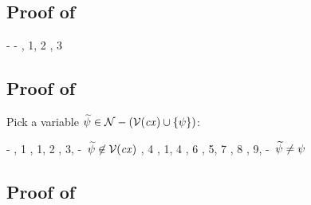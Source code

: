 \subsection*{Proof of }

\begin{derivation}
     {\hyp}
     {\hyp}
\step{\hastyO{\eqO}{\bool}}
     {\Reeq, 1, 2}
\step{\hastyO{\nega{(\eqO)}}{\bool}}
     {\Renega, 3}
\end{derivation}



\subsection*{Proof of }

Pick a variable $\widetilde{\psi}\in\mathcal{N}-(\mathcal{V}(\mathit{cx})\cup\{\psi\})$:
\begin{derivation}
\step{\istyO{\typ}}
     {\hyp}
\step{\istyO{\bool}}
     {\Rtbool, 1}
\step{\istyO{\tarr{\typ}{\bool}}}
     {\RtarrI, 1, 2}
\step{\cxwf{\snoc{\cx}{\vdec{\varFXpred}{\tarr{\typ}{\bool}}}}}
     {\RcxvdecI, 3, \hyp\ $\widetilde{\psi}\not\in\mathcal{V}(\mathit{cx})$}
\step{\hasty{\snoc{\cx}{\vdec{\varFXpred}{\tarr{\typ}{\bool}}}}
            {\varFXpred}{\tarr{\typ}{\bool}}}
     {\Revar, 4}
\step{\isty{\snoc{\cx}{\vdec{\varFXpred}{\tarr{\typ}{\bool}}}}{\typ}}
     {, 1, 4}
\step{\hasty{\snoc{\cx}{\vdec{\varFXpred}{\tarr{\typ}{\bool}}}}
            {\abs{\varfx}{\typ}{\true}}{\tarr{\typ}{\bool}}}
     {\Reconsttrue, 6}
\step{\hasty{\snoc{\cx}{\vdec{\varFXpred}{\tarr{\typ}{\bool}}}}
            {\eq{\varFXpred}{\abs{\varfx}{\typ}{\true}}}{\bool}}
     {\Reeq, 5, 7}
\step{\hastyO{\abs{\varFXpred}
                  {\tarr{\typ}{\bool}}
                  {(\eq{\varFXpred}{\abs{\varfx}{\typ}{\true}})}}
             {\tarr{(\tarr{\typ}{\bool})}{\bool}}}
     {\Reabs, 8}
\step{\hastyO{\abs{\varfxpred}
                  {\tarr{\typ}{\bool}}
                  {(\eq{\varfxpred}{\abs{\varfx}{\typ}{\true}})}}
             {\tarr{(\tarr{\typ}{\bool})}{\bool}}}
     {\Reabsalpha, 9, \hyp\ $\widetilde{\psi}\neq\psi$}
\end{derivation}



\subsection*{Proof of }

\begin{derivation}
\step{\hasty{\snoc{\cx}{\vdecO}}{\expr}{\bool}}{\hyp}
\end{derivation}



